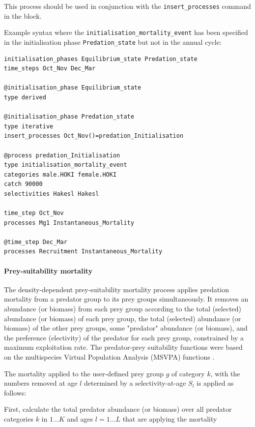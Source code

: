 This process should be used in conjunction with the \texttt{insert\_processes} command in the  block.

Example syntax where the \texttt{initialisation\_mortality\_event} has been specified in the initialisation phase \texttt{Predation\_state} but not in the annual cycle:

{\small{\begin{verbatim}
initialisation_phases Equilibrium_state Predation_state
time_steps Oct_Nov Dec_Mar

@initialisation_phase Equilibrium_state
type derived

@initialisation_phase Predation_state
type iterative
insert_processes Oct_Nov()=predation_Initialisation

@process predation_Initialisation
type initialisation_mortality_event
categories male.HOKI female.HOKI
catch 90000
selectivities Hakesl Hakesl

time_step Oct_Nov
processes Mg1 Instantaneous_Mortality

@time_step Dec_Mar
processes Recruitment Instantaneous_Mortality
\end{verbatim}}}

\paragraph{Prey-suitability mortality}\label{sec:Process-MortalityPreySuitability} 

The density-dependent prey-suitability mortality process applies predation mortality from a predator group to its prey groups simultaneously. It removes an abundance (or biomass) from each prey group according to the total (selected) abundance (or biomass) of each prey group, the total (selected) abundance (or biomass) of the other prey groups, some "predator" abundance (or biomass), and the preference (electivity) of the predator for each prey group, constrained by a maximum exploitation rate. The predator-prey suitability functions were based on the multispecies Virtual Population Analysis (MSVPA) functions \citep{JuradoMolina2005}.

The mortality applied to the user-defined prey group $g$ of category $k$, with the numbers removed at age $l$ determined by a selectivity-at-age $S_l$ is applied as follows:

First, calculate the total predator abundance (or biomass) over all predator categories $k$ in $1 \ldots K$ and ages $l = 1 \ldots L$ that are applying the mortality

